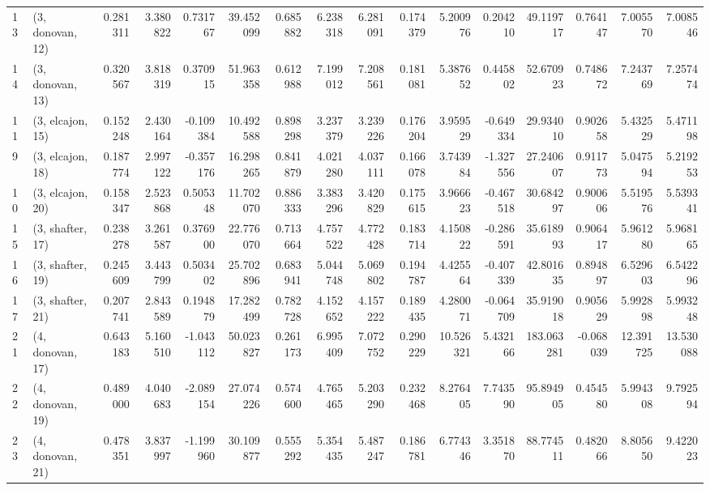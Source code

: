 \begin{tabular}{llrrrrrrrrrrrrrr}
13 &  (3, donovan, 12) &   0.281311 &  3.380822 &  0.731767 &  39.452099 &  0.685882 &   6.238318 &  6.281091 &  0.174379 &   5.200976 &  0.204210 &   49.119717 &  0.764147 &   7.005570 &   7.008546 \\
14 &  (3, donovan, 13) &   0.320567 &  3.818319 &  0.370915 &  51.963358 &  0.612988 &   7.199012 &  7.208561 &  0.181081 &   5.387652 &  0.445802 &   52.670923 &  0.748672 &   7.243769 &   7.257474 \\
11 &  (3, elcajon, 15) &   0.152248 &  2.430164 & -0.109384 &  10.492588 &  0.898298 &   3.237379 &  3.239226 &  0.176204 &   3.959529 & -0.649334 &   29.934010 &  0.902658 &   5.432529 &   5.471198 \\
9  &  (3, elcajon, 18) &   0.187774 &  2.997122 & -0.357176 &  16.298265 &  0.841879 &   4.021280 &  4.037111 &  0.166078 &   3.743984 & -1.327556 &   27.240607 &  0.911773 &   5.047594 &   5.219253 \\
10 &  (3, elcajon, 20) &   0.158347 &  2.523868 &  0.505348 &  11.702070 &  0.886333 &   3.383296 &  3.420829 &  0.175615 &   3.966623 & -0.467518 &   30.684297 &  0.900606 &   5.519576 &   5.539341 \\
15 &  (3, shafter, 17) &   0.238278 &  3.261587 &  0.376900 &  22.776070 &  0.713664 &   4.757522 &  4.772428 &  0.183714 &   4.150822 & -0.286591 &   35.618993 &  0.906417 &   5.961280 &   5.968165 \\
16 &  (3, shafter, 19) &   0.245609 &  3.443799 &  0.503402 &  25.702896 &  0.683941 &   5.044748 &  5.069802 &  0.194787 &   4.425564 & -0.407339 &   42.801635 &  0.894897 &   6.529603 &   6.542296 \\
17 &  (3, shafter, 21) &   0.207741 &  2.843589 &  0.194879 &  17.282499 &  0.782728 &   4.152652 &  4.157222 &  0.189435 &   4.280071 & -0.064709 &   35.919018 &  0.905629 &   5.992898 &   5.993248 \\
21 &  (4, donovan, 17) &   0.643183 &  5.160510 & -1.043112 &  50.023827 &  0.261173 &   6.995409 &  7.072752 &  0.290229 &  10.526321 &  5.432166 &  183.063281 & -0.068039 &  12.391725 &  13.530088 \\
22 &  (4, donovan, 19) &   0.489000 &  4.040683 & -2.089154 &  27.074226 &  0.574600 &   4.765465 &  5.203290 &  0.232468 &   8.276405 &  7.743590 &   95.894905 &  0.454580 &   5.994308 &   9.792594 \\
23 &  (4, donovan, 21) &   0.478351 &  3.837997 & -1.199960 &  30.109877 &  0.555292 &   5.354435 &  5.487247 &  0.186781 &   6.774346 &  3.351870 &   88.774511 &  0.482066 &   8.805650 &   9.422023 \\

\end{tabular}
